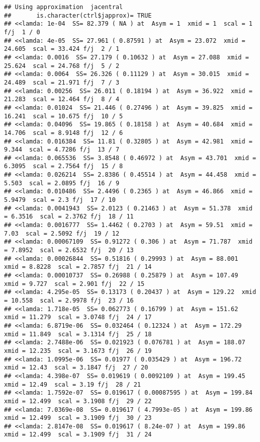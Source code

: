 \documentclass[
]{article}
\begin{document}
\begin{verbatim}
## Using approximation  jacentral  
##       is.character(ctrl$japprox)= TRUE 
## <<lamda: 1e-04  SS= 82.379 ( NA ) at  Asym = 1  xmid = 1  scal = 1 f/j  1 / 0
## <<lamda: 4e-05  SS= 27.961 ( 0.87591 ) at  Asym = 23.072  xmid = 24.605  scal = 33.424 f/j  2 / 1
## <<lamda: 0.0016  SS= 27.179 ( 0.10632 ) at  Asym = 27.088  xmid = 25.624  scal = 24.768 f/j  5 / 2
## <<lamda: 0.0064  SS= 26.326 ( 0.11129 ) at  Asym = 30.015  xmid = 24.489  scal = 21.971 f/j  7 / 3
## <<lamda: 0.00256  SS= 26.011 ( 0.18194 ) at  Asym = 36.922  xmid = 21.283  scal = 12.464 f/j  8 / 4
## <<lamda: 0.01024  SS= 21.446 ( 0.27496 ) at  Asym = 39.825  xmid = 16.241  scal = 10.675 f/j  10 / 5
## <<lamda: 0.04096  SS= 19.865 ( 0.18158 ) at  Asym = 40.684  xmid = 14.706  scal = 8.9148 f/j  12 / 6
## <<lamda: 0.016384  SS= 11.81 ( 0.32805 ) at  Asym = 42.981  xmid = 9.344  scal = 4.7286 f/j  13 / 7
## <<lamda: 0.065536  SS= 3.8548 ( 0.46972 ) at  Asym = 43.701  xmid = 6.3095  scal = 2.7564 f/j  15 / 8
## <<lamda: 0.026214  SS= 2.8386 ( 0.45514 ) at  Asym = 44.458  xmid = 5.503  scal = 2.0895 f/j  16 / 9
## <<lamda: 0.010486  SS= 2.4496 ( 0.2365 ) at  Asym = 46.866  xmid = 5.9479  scal = 2.3 f/j  17 / 10
## <<lamda: 0.0041943  SS= 2.0123 ( 0.21463 ) at  Asym = 51.378  xmid = 6.3516  scal = 2.3762 f/j  18 / 11
## <<lamda: 0.0016777  SS= 1.4462 ( 0.2703 ) at  Asym = 59.51  xmid = 7.03  scal = 2.5092 f/j  19 / 12
## <<lamda: 0.00067109  SS= 0.91272 ( 0.306 ) at  Asym = 71.787  xmid = 7.8952  scal = 2.6532 f/j  20 / 13
## <<lamda: 0.00026844  SS= 0.51816 ( 0.29993 ) at  Asym = 88.001  xmid = 8.8228  scal = 2.7857 f/j  21 / 14
## <<lamda: 0.00010737  SS= 0.26988 ( 0.25879 ) at  Asym = 107.49  xmid = 9.727  scal = 2.901 f/j  22 / 15
## <<lamda: 4.295e-05  SS= 0.13173 ( 0.20437 ) at  Asym = 129.22  xmid = 10.558  scal = 2.9978 f/j  23 / 16
## <<lamda: 1.718e-05  SS= 0.062773 ( 0.16799 ) at  Asym = 151.62  xmid = 11.279  scal = 3.0748 f/j  24 / 17
## <<lamda: 6.8719e-06  SS= 0.032464 ( 0.12324 ) at  Asym = 172.29  xmid = 11.849  scal = 3.1314 f/j  25 / 18
## <<lamda: 2.7488e-06  SS= 0.021923 ( 0.076781 ) at  Asym = 188.07  xmid = 12.235  scal = 3.1673 f/j  26 / 19
## <<lamda: 1.0995e-06  SS= 0.01977 ( 0.035429 ) at  Asym = 196.72  xmid = 12.43  scal = 3.1847 f/j  27 / 20
## <<lamda: 4.398e-07  SS= 0.019619 ( 0.0092109 ) at  Asym = 199.45  xmid = 12.49  scal = 3.19 f/j  28 / 21
## <<lamda: 1.7592e-07  SS= 0.019617 ( 0.00087595 ) at  Asym = 199.84  xmid = 12.499  scal = 3.1908 f/j  29 / 22
## <<lamda: 7.0369e-08  SS= 0.019617 ( 4.7993e-05 ) at  Asym = 199.86  xmid = 12.499  scal = 3.1909 f/j  30 / 23
## <<lamda: 2.8147e-08  SS= 0.019617 ( 8.24e-07 ) at  Asym = 199.86  xmid = 12.499  scal = 3.1909 f/j  31 / 24
\end{verbatim}
\end{document}
